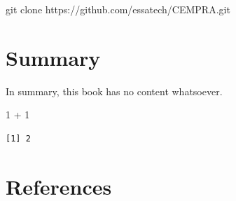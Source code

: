 \documentclass[
  letterpaper,
  DIV=11,
  numbers=noendperiod]{scrreprt}
\newenvironment{Shaded}{\begin{snugshade}}{\end{snugshade}}
\newcommand{\DecValTok}[1]{\textcolor[rgb]{0.68,0.00,0.00}{#1}}
\newcommand{\FunctionTok}[1]{\textcolor[rgb]{0.28,0.35,0.67}{#1}}
\newcommand{\NormalTok}[1]{\textcolor[rgb]{0.00,0.23,0.31}{#1}}
\newcommand{\SpecialCharTok}[1]{\textcolor[rgb]{0.37,0.37,0.37}{#1}}
\begin{document}
\begin{Shaded}
\begin{Highlighting}[]
\FunctionTok{git}\NormalTok{ clone https://github.com/essatech/CEMPRA.git}
\end{Highlighting}
\end{Shaded}


\hypertarget{summary}{%
\chapter{Summary}\label{summary}}

In summary, this book has no content whatsoever.

\begin{Shaded}
\begin{Highlighting}[]
\DecValTok{1} \SpecialCharTok{+} \DecValTok{1}
\end{Highlighting}
\end{Shaded}

\begin{verbatim}
[1] 2
\end{verbatim}


\hypertarget{references}{%
\chapter*{References}\label{references}}

\end{document}
